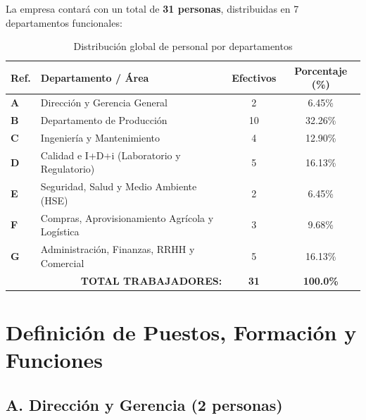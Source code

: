 La empresa contará con un total de \textbf{31 personas}, distribuidas en 7 departamentos funcionales:

\begin{table}[H]
    \centering
    \caption{Distribución global de personal por departamentos}
    \label{tab:resumen_personal}
    \begin{tabular}{@{}llcc@{}}
        \toprule
        \textbf{Ref.} & \textbf{Departamento / Área} & \textbf{Efectivos} & \textbf{Porcentaje (\%)} \\
        \midrule
        \textbf{A} & Dirección y Gerencia General & 2 & 6.45\% \\
        \textbf{B} & Departamento de Producción & 10 & 32.26\% \\
        \textbf{C} & Ingeniería y Mantenimiento & 4 & 12.90\% \\
        \textbf{D} & Calidad e I+D+i (Laboratorio y Regulatorio) & 5 & 16.13\% \\
        \textbf{E} & Seguridad, Salud y Medio Ambiente (HSE) & 2 & 6.45\% \\
        \textbf{F} & Compras, Aprovisionamiento Agrícola y Logística & 3 & 9.68\% \\
        \textbf{G} & Administración, Finanzas, RRHH y Comercial & 5 & 16.13\% \\
        \midrule
        \multicolumn{2}{r}{\textbf{TOTAL TRABAJADORES:}} & \textbf{31} & \textbf{100.0\%} \\
        \bottomrule
    \end{tabular}
\end{table}

\section{Definición de Puestos, Formación y Funciones}

\subsection{A. Dirección y Gerencia (2 personas)}

